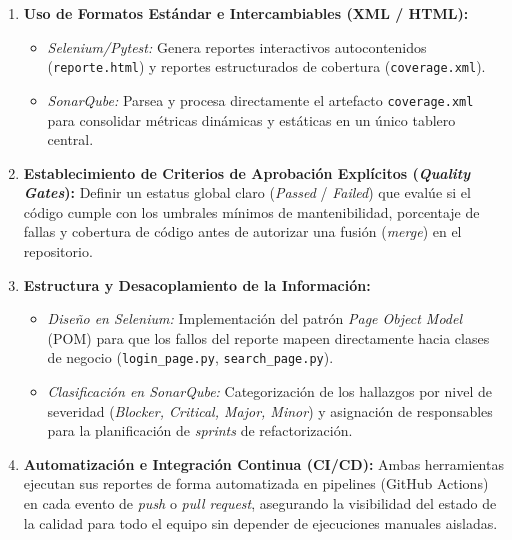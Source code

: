 \documentclass[12pt,a4paper]{article}
\begin{document}
\begin{enumerate}[leftmargin=*]
    \item \textbf{Uso de Formatos Estándar e Intercambiables (XML / HTML):}
    \begin{itemize}
        \item \textit{Selenium/Pytest:} Genera reportes interactivos autocontenidos (\texttt{reporte.html}) y reportes estructurados de cobertura (\texttt{coverage.xml}).
        \item \textit{SonarQube:} Parsea y procesa directamente el artefacto \texttt{coverage.xml} para consolidar métricas dinámicas y estáticas en un único tablero central.
    \end{itemize}
    \item \textbf{Establecimiento de Criterios de Aprobación Explícitos (\textit{Quality Gates}):}
    Definir un estatus global claro (\textit{Passed} / \textit{Failed}) que evalúe si el código cumple con los umbrales mínimos de mantenibilidad, porcentaje de fallas y cobertura de código antes de autorizar una fusión (\textit{merge}) en el repositorio.
    \item \textbf{Estructura y Desacoplamiento de la Información:}
    \begin{itemize}
        \item \textit{Diseño en Selenium:} Implementación del patrón \textit{Page Object Model} (POM) para que los fallos del reporte mapeen directamente hacia clases de negocio (\texttt{login\_page.py}, \texttt{search\_page.py}).
        \item \textit{Clasificación en SonarQube:} Categorización de los hallazgos por nivel de severidad (\textit{Blocker, Critical, Major, Minor}) y asignación de responsables para la planificación de \textit{sprints} de refactorización.
    \end{itemize}
    \item \textbf{Automatización e Integración Continua (CI/CD):}
    Ambas herramientas ejecutan sus reportes de forma automatizada en pipelines (GitHub Actions) en cada evento de \textit{push} o \textit{pull request}, asegurando la visibilidad del estado de la calidad para todo el equipo sin depender de ejecuciones manuales aisladas.
\end{enumerate}
\end{document}

